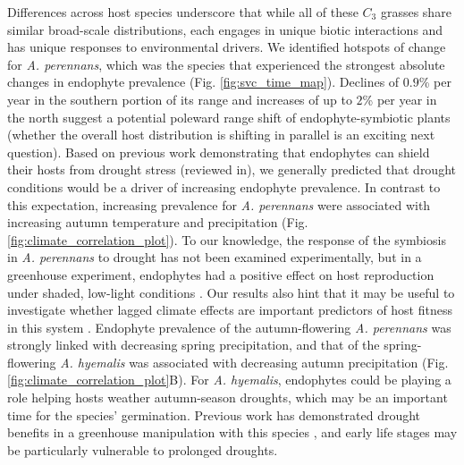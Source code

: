 \documentclass[11pt]{article}
\let\cite\citep
\begin{document}
Differences across host species underscore that while all of these $C_3$ grasses share similar broad-scale distributions, each engages in unique biotic interactions and has unique responses to environmental drivers.
We identified hotspots of change for \emph{A. perennans}, which was the species that experienced the strongest absolute changes in endophyte prevalence (Fig. \ref{fig:svc_time_map}).
Declines of $0.9$\% per year in the southern portion of its range and increases of up to $2$\% per year in the north suggest a potential poleward range shift of endophyte-symbiotic plants (whether the overall host distribution is shifting in parallel is an exciting next question). 
Based on previous work demonstrating that endophytes can shield their hosts from drought stress (reviewed in\citet{decunta2021systematic}), we generally predicted that drought conditions would be a driver of increasing endophyte prevalence. 
In contrast to this expectation, increasing prevalence for \emph{A. perennans} were associated with increasing autumn temperature and precipitation (Fig. \ref{fig:climate_correlation_plot}). 
To our knowledge, the response of the symbiosis in \emph{A. perennans} to drought has not been examined experimentally, but in a greenhouse experiment, endophytes had a positive effect on host reproduction under shaded, low-light conditions \citep{davitt2010costs}. 
Our results also hint that it may be useful to investigate whether lagged climate effects are important predictors of host fitness in this system \cite{evers2021lagged}.
Endophyte prevalence of the autumn-flowering \emph{A. perennans} was strongly linked with decreasing spring precipitation, and that of the spring-flowering \emph{A. hyemalis} was associated with decreasing autumn precipitation (Fig. \ref{fig:climate_correlation_plot}B). 
For \emph{A. hyemalis}, endophytes could be playing a role helping hosts weather autumn-season droughts, which may be an important time for the species' germination.
Previous work has demonstrated drought benefits in a greenhouse manipulation with this species \citep{davitt2011understanding}, and early life stages may be particularly vulnerable to prolonged droughts.
\end{document}
